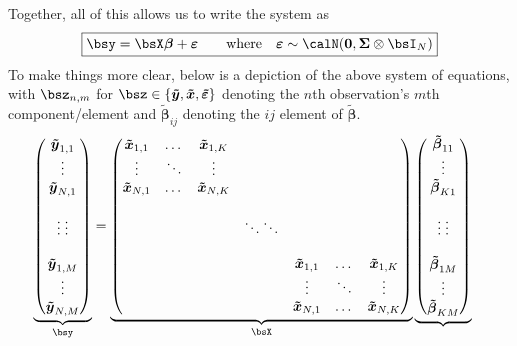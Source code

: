 \documentclass[12pt]{article}
\theoremstyle{plain}
\theoremstyle{definition}
\theoremstyle{remark}
\newcommand{\bsSigma}{\boldsymbol{\Sigma}}
\newcommand{\bsvarepsilon}{\boldsymbol{\varepsilon}}
\newcommand{\bsbeta}{\boldsymbol{\beta}}
\newcommand{\bstildebeta}{\boldsymbol{\tilde{\beta}}}
\newcommand{\bstildey}{\boldsymbol{\tilde{y}}}
\newcommand{\bstildex}{\boldsymbol{\tilde{x}}}
\newcommand{\bstildevarepsilon}{\boldsymbol{\tilde{\varepsilon}}}
\renewcommand{\bso}{\boldsymbol{0}}
\begin{document}
Together, all of this allows us to write the system as
\begin{align}
  \boxed{%
    \bsy = \bsX\bsbeta + \bsvarepsilon
    \qquad \text{where}\quad
    \bsvarepsilon\sim
    \calN(\bso,\bsSigma \otimes \bsI_N)
  }
  \label{stackedmodel}
\end{align}
To make things more clear, below is a depiction of the above system of
equations, with $\bsz_{n,m}$ for
$\bsz\in\{\bstildey,\bstildex,\bstildevarepsilon\}$ denoting the
$n$th observation's $m$th component/element and $\bstildebeta_{ij}$ denoting
the $ij$ element of $\bstildebeta$.
\begin{align*}
  \underbrace{%
    \begin{pmatrix}
      \bstildey_{1,1} \\ \vdots \\ \bstildey_{N,1} \\\\
      \vdots\;\vdots\\\\
      \bstildey_{1,M} \\ \vdots \\ \bstildey_{N,M} \\
    \end{pmatrix}
  }_{\bsy}
  &=
  \underbrace{%
    \begin{pmatrix}
      \bstildex_{1,1} & \dots & \bstildex_{1,K} \\
      \vdots & \ddots & \vdots \\
      \bstildex_{N,1} & \dots & \bstildex_{N,K} \\\\
      & & & \ddots\ddots \\\\
      & &  &  & \bstildex_{1,1} & \dots & \bstildex_{1,K} \\
      & & & &\vdots & \ddots & \vdots \\
      & & & & \bstildex_{N,1} & \dots & \bstildex_{N,K} \\
    \end{pmatrix}
  }_{\bsX}
  \underbrace{%
    \begin{pmatrix}
      \bstildebeta_{11} \\ \vdots \\ \bstildebeta_{K1} \\\\
      \vdots\;\vdots\\\\
      \bstildebeta_{1M} \\ \vdots \\ \bstildebeta_{KM} \\

\end{pmatrix}}
\end{align*}
\end{document}

